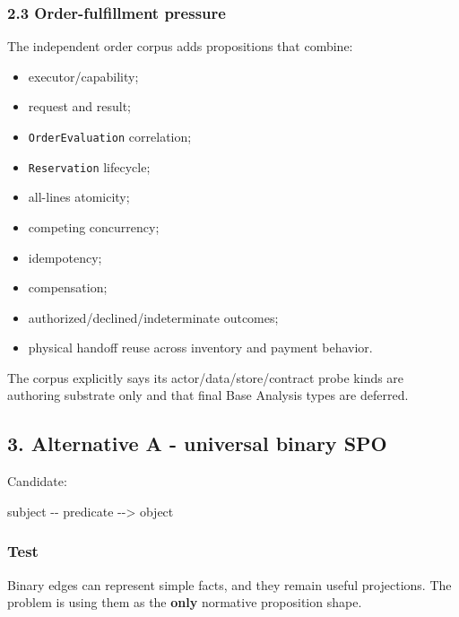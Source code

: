 \documentclass[
  10pt,
  letterpaper,
]{article}
\newenvironment{Shaded}{}{}
\newcommand{\NormalTok}[1]{#1}
\providecommand{\tightlist}{%
  \setlength{\itemsep}{0pt}\setlength{\parskip}{0pt}}
\begin{document}
\subsubsection{2.3 Order-fulfillment
pressure}\label{order-fulfillment-pressure}

The independent order corpus adds propositions that combine:

\begin{itemize}
\tightlist
\item
  executor/capability;
\item
  request and result;
\item
  \texttt{OrderEvaluation} correlation;
\item
  \texttt{Reservation} lifecycle;
\item
  all-lines atomicity;
\item
  competing concurrency;
\item
  idempotency;
\item
  compensation;
\item
  authorized/declined/indeterminate outcomes;
\item
  physical handoff reuse across inventory and payment behavior.
\end{itemize}

The corpus explicitly says its actor/data/store/contract probe kinds are
authoring substrate only and that final Base Analysis types are
deferred.

\subsection{3. Alternative A - universal binary
SPO}\label{alternative-a---universal-binary-spo}

Candidate:

\begin{Shaded}
\begin{Highlighting}[]
\NormalTok{subject {-}{-} predicate {-}{-}\textgreater{} object}
\end{Highlighting}
\end{Shaded}

\subsubsection{Test}\label{test}

Binary edges can represent simple facts, and they remain useful
projections. The problem is using them as the \textbf{only} normative
proposition shape.
\end{document}
